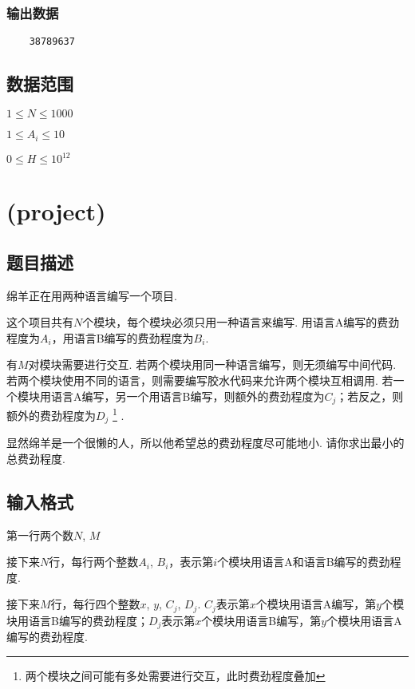 \documentclass{article}
\begin{document}
\begin{CJK*}{UTF8}{gbsn}
\begin{spacing}{0.8}
\begin{multicols}{3}
    \subsubsection*{输出数据}
    \begin{verbatim}
    38789637
    \end{verbatim}
    \end{multicols}
    \end{spacing}

    \subsection*{数据范围}
    $1 \leq N \leq 1000$

    $1 \leq A_i \leq 10$

    $0 \leq H \leq 10^{12}$

    \newpage






    \section*{(project)}
    \subsection*{题目描述}
    绵羊正在用两种语言编写一个项目.

    这个项目共有$N$个模块，每个模块必须只用一种语言来编写. 用语言A编写的费劲程度为$A_i$，用语言B编写的费劲程度为$B_i$.

    有$M$对模块需要进行交互. 若两个模块用同一种语言编写，则无须编写中间代码. 若两个模块使用不同的语言，则需要编写胶水代码来允许两个模块互相调用. 若一个模块用语言A编写，另一个用语言B编写，则额外的费劲程度为$C_j$；若反之，则额外的费劲程度为$D_j$%
    \footnote{两个模块之间可能有多处需要进行交互，此时费劲程度叠加}%
    .

    显然绵羊是一个很懒的人，所以他希望总的费劲程度尽可能地小. 请你求出最小的总费劲程度.

    \subsection*{输入格式}
    第一行两个数$N$, $M$

    接下来$N$行，每行两个整数$A_i$, $B_i$，表示第$i$个模块用语言A和语言B编写的费劲程度.

    接下来$M$行，每行四个整数$x$, $y$, $C_j$, $D_j$. $C_j$表示第$x$个模块用语言A编写，第$y$个模块用语言B编写的费劲程度；$D_j$表示第$x$个模块用语言B编写，第$y$个模块用语言A编写的费劲程度.


\end{CJK*}
\end{document}
